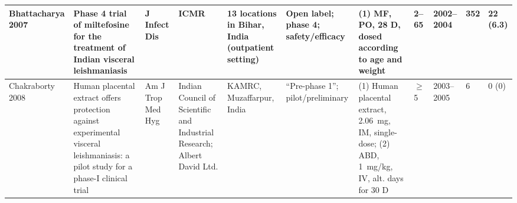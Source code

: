 \begin{ThreePartTable}
\begin{longtable}[c]{L{1.5cm} L{3.5cm} L{1.3cm} L{2.5cm} L{2.5cm} L{2.5cm} L{3cm} L{1.5cm} L{1cm} L{1cm} L{1.3cm}}
    Bhattacharya 2007\cite{bhattacharya2007}        & Phase 4 trial of miltefosine for the treatment of Indian visceral leishmaniasis                                                                                                                                             & J Infect Dis             & ICMR                                                                                 & 13 locations in Bihar, India (outpatient setting) & Open label; phase 4; safety/efficacy                                               & (1) MF, PO, 28 D, dosed according to age and weight                                                                                                                                                        & 2--65       & 2002--2004   & 352 & 22 (6.3)                                                                                                                                                                                                                                                                                                                                                                                                                                                                                                                                                                                       \\ \midrule
    Chakraborty 2008\cite{chakraborty2008}          & Human placental extract offers protection against experimental visceral leishmaniasis: a pilot study for a phase-I clinical trial                                                                                           & Am J Trop Med Hyg        & Indian Council of Scientific and Industrial Research; Albert David Ltd.              & KAMRC, Muzaffarpur, India                         & ``Pre-phase 1''; pilot/preliminary                                                 & (1) Human placental extract, 2.06~mg, IM, single-dose; (2) ABD, 1~mg/kg, IV, alt. days for 30 D                                                                                                              & $\geq$ 5    & 2003--2005   & 6            & 0 (0)                                                                                                                                                                                                                                                                                                                                                                                                                                                                                                                                                                                          \\ \midrule

\end{longtable}
\end{ThreePartTable}
